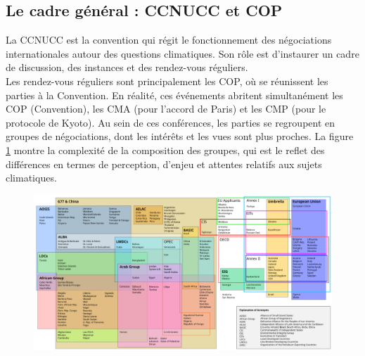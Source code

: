 \subsection{Le cadre général : CCNUCC et COP}
\label{sect:1.2.2}


La \Gls{CCNUCC} est la convention qui régit le fonctionnement des négociations internationales autour des questions climatiques. Son rôle est d'instaurer un cadre de discussion, des instances et des rendez-vous réguliers. \\

Les rendez-vous réguliers sont principalement les \Gls{COP}, où se réunissent les parties à la Convention. En réalité, ces événements abritent simultanément les COP (Convention), les CMA (pour l'accord de Paris) et les CMP (pour le protocole de Kyoto). Au sein de ces conférences, les parties se regroupent en groupes de négociations, dont les intérêts et les vues sont plus proches. La figure \ref{fig:COP} montre la complexité de la composition des groupes, qui est le reflet des différences en termes de perception, d'enjeu et attentes relatifs aux sujets climatiques. \\

\begin{figure}
    \centering
    \includegraphics[width=1\linewidth]{figures/UNFCCC_Party_Groupings.svg.png}
    \label{fig:COP}
\end{figure}

